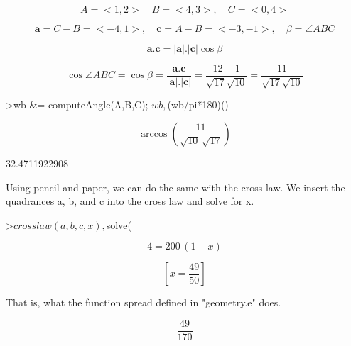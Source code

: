 \documentclass{article}
\begin{document}
\begin{eulernotebook}
\begin{eulercomment}
\begin{eulercomment}
\begin{eulercomment}
\begin{eulercomment}
\begin{eulercomment}
\begin{eulercomment}
\begin{eulercomment}
\end{eulercomment}
\begin{eulerformula}
\[
A=<1,2>\quad B=<4,3>,\quad C=<0,4>
\]
\end{eulerformula}
\begin{eulerformula}
\[
\mathbf{a}=C-B=<-4,1>,\quad \mathbf{c}=A-B=<-3,-1>,\quad \beta=\angle ABC
\]
\end{eulerformula}
\begin{eulerformula}
\[
\mathbf{a}.\mathbf{c}=|\mathbf{a}|.|\mathbf{c}|\cos \beta
\]
\end{eulerformula}
\begin{eulerformula}
\[
\cos \angle ABC =\cos\beta=\frac{\mathbf{a}.\mathbf{c}}{|\mathbf{a}|.|\mathbf{c}|}=\frac{12-1}{\sqrt{17}\sqrt{10}}=\frac{11}{\sqrt{17}\sqrt{10}}
\]
\end{eulerformula}
\begin{eulerprompt}
>wb &= computeAngle(A,B,C); $wb, $(wb/pi*180)()
\end{eulerprompt}
\begin{eulerformula}
\[
\arccos \left(\frac{11}{\sqrt{10}\,\sqrt{17}}\right)
\]
\end{eulerformula}
\begin{euleroutput}
  32.4711922908
\end{euleroutput}
\begin{eulercomment}
Using pencil and paper, we can do the same with the cross law. We
insert the quadrances a, b, and c into the cross law and solve for x.
\end{eulercomment}
\begin{eulerprompt}
>$crosslaw(a,b,c,x), $solve(%
\end{eulerprompt}
\begin{eulerformula}
\[
4=200\,\left(1-x\right)
\]
\end{eulerformula}
\begin{eulerformula}
\[
\left[ x=\frac{49}{50} \right] 
\]
\end{eulerformula}
\begin{eulercomment}
That is, what the function spread defined in "geometry.e" does.
\end{eulercomment}
\begin{eulerformula}
\[
\frac{49}{170}
\]
\end{eulerformula}
\begin{eulercomment}

\end{eulercomment}
\end{eulercomment}
\end{eulercomment}
\end{eulercomment}
\end{eulercomment}
\end{eulercomment}
\end{eulercomment}
\end{eulernotebook}
\end{document}
